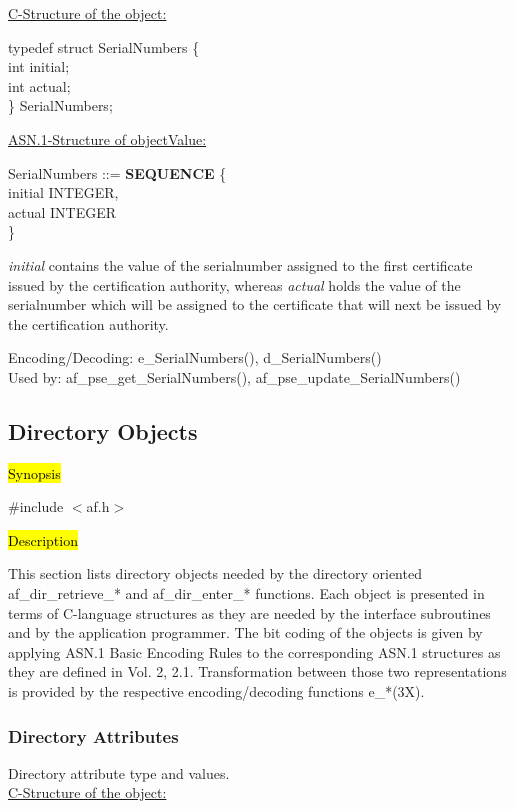 \underline{C-Structure of the object:}

{\small
\bvtab
\4      typedef struct SerialNumbers \{ \\
\6              int   \3 initial; \\
\6              int   \3 actual; \\
\4      \} SerialNumbers;
\evtab
}

\underline{ASN.1-Structure of objectValue:}

{\small
\bvtab
\3 SerialNumbers ::= \3 {\bf SEQUENCE} \{     \\
\7 initial         \2 INTEGER,    \\
\7 actual          \2 INTEGER     \\
\6 \}
\evtab
}

{\em initial} contains the value of the serialnumber assigned to the first
certificate issued by the certification authority, whereas {\em actual}
holds the value of the serialnumber which will be assigned to the certificate that will next be issued
by the certification authority.


Encoding/Decoding: e\_SerialNumbers(), d\_SerialNumbers() \\
Used by: af\_pse\_get\_SerialNumbers(), af\_pse\_update\_SerialNumbers()


\subsection{Directory Objects}
\label{af-dirobj}

\hl{Synopsis}

\#include $<$af.h$>$

\hl{Description}
     
This section lists directory objects needed by the
directory oriented af\_dir\_retrieve\_* and af\_dir\_enter\_* functions.
Each object is presented in terms of C-language structures
as they are needed by the interface subroutines and
by the application programmer.
The bit coding of the objects is given by applying
ASN.1 Basic Encoding Rules to the corresponding ASN.1 structures as they
are defined in Vol. 2, 2.1. Transformation between those two representations
is provided by the respective encoding/decoding functions e\_*(3X).

\subsubsection{Directory Attributes}
Directory attribute type and values. \\
\underline{C-Structure of the object:}

